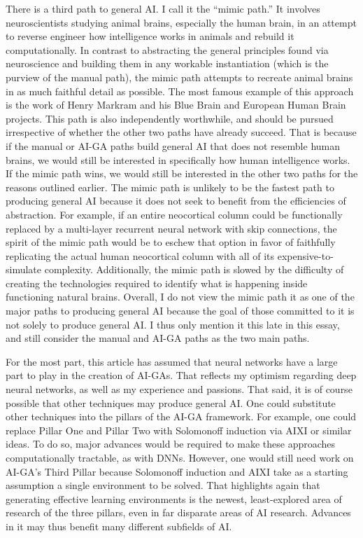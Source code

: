 \documentclass{article}
\begin{document}
There is a third path to general AI. I call it the ``mimic path.'' It involves neuroscientists studying animal brains, especially the human brain, in an attempt to reverse engineer how intelligence works in animals and rebuild it computationally. In contrast to abstracting the general principles found via neuroscience and building them in any workable instantiation (which is the purview of the manual path), the mimic path attempts to recreate animal brains in as much faithful detail as possible. The most famous example of this approach is the work of  Henry Markram and his Blue Brain and European Human Brain projects. This path is also independently worthwhile, and should be pursued irrespective of whether the other two paths have already succeed. That is because if the manual or AI-GA paths build general AI that does not resemble human brains, we would still be interested in specifically how human intelligence works. If the mimic path wins, we would still be interested in the other two paths for the reasons outlined earlier. The mimic path is unlikely to be the fastest path to producing general AI because it does not seek to benefit from the efficiencies of abstraction. For example, if an entire neocortical column could be functionally replaced by a multi-layer recurrent neural network with skip connections, the spirit of the mimic path would be to eschew that option in favor of faithfully replicating the actual human neocortical column with all of its expensive-to-simulate complexity. Additionally, the mimic path is slowed by the difficulty of creating the technologies required to identify what is happening inside functioning natural brains. Overall, I do not view the mimic path it as one of the major paths to producing general AI because the goal of those committed to it is not solely to produce general AI. I thus only mention it this late in this essay, and still consider the manual and AI-GA paths as the two main paths. 

For the most part, this article has assumed that neural networks have a large part to play in the creation of AI-GAs. That reflects my optimism regarding deep neural networks, as well as my experience and passions. That said, it is of course possible that other techniques may produce general AI. One could substitute other techniques into the pillars of the AI-GA framework. For example, one could replace Pillar One and Pillar Two with Solomonoff induction via AIXI \cite{hutter2004universal,hutter2000theory} or similar ideas. To do so, major advances would be required to make these approaches computationally tractable, as with DNNs. However, one would still need work on AI-GA's Third Pillar because Solomonoff induction and AIXI take as a starting assumption a single environment to be solved. That highlights again that generating effective learning environments is the newest, least-explored area of research of the three pillars, even in far disparate areas of AI research. Advances in it may thus benefit many different subfields of AI. 
\end{document}
